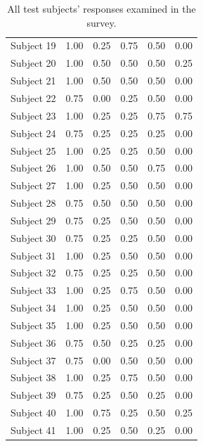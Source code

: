 \begin{table}[!htp]
{\begin{tabular}{l||c|c|c|c|c}
Subject 19 & 1.00 & 0.25 & 0.75 & 0.50 & 0.00 \\
Subject 20 & 1.00 & 0.50 & 0.50 & 0.50 & 0.25 \\
Subject 21 & 1.00 & 0.50 & 0.50 & 0.50 & 0.00 \\
Subject 22 & 0.75 & 0.00 & 0.25 & 0.50 & 0.00 \\
Subject 23 & 1.00 & 0.25 & 0.25 & 0.75 & 0.75 \\
Subject 24 & 0.75 & 0.25 & 0.25 & 0.25 & 0.00 \\
Subject 25 & 1.00 & 0.25 & 0.25 & 0.50 & 0.00 \\
Subject 26 & 1.00 & 0.50 & 0.50 & 0.75 & 0.00 \\
Subject 27 & 1.00 & 0.25 & 0.50 & 0.50 & 0.00 \\
Subject 28 & 0.75 & 0.50 & 0.50 & 0.50 & 0.00 \\
Subject 29 & 0.75 & 0.25 & 0.50 & 0.50 & 0.00 \\
Subject 30 & 0.75 & 0.25 & 0.25 & 0.50 & 0.00 \\
Subject 31 & 1.00 & 0.25 & 0.50 & 0.50 & 0.00 \\
Subject 32 & 0.75 & 0.25 & 0.25 & 0.50 & 0.00 \\
Subject 33 & 1.00 & 0.25 & 0.75 & 0.50 & 0.00 \\
Subject 34 & 1.00 & 0.25 & 0.50 & 0.50 & 0.00 \\
Subject 35 & 1.00 & 0.25 & 0.50 & 0.50 & 0.00 \\
Subject 36 & 0.75 & 0.50 & 0.25 & 0.25 & 0.00 \\
Subject 37 & 0.75 & 0.00 & 0.50 & 0.50 & 0.00 \\
Subject 38 & 1.00 & 0.25 & 0.75 & 0.50 & 0.00 \\
Subject 39 & 0.75 & 0.25 & 0.50 & 0.25 & 0.00 \\
Subject 40 & 1.00 & 0.75 & 0.25 & 0.50 & 0.25 \\
Subject 41 & 1.00 & 0.25 & 0.50 & 0.25 & 0.00 \\
\end{tabular}
}
\caption[Survey: Raw Data]{All test subjects' responses examined in the survey.}
\label{tab:survey_ttest}
\end{table}
